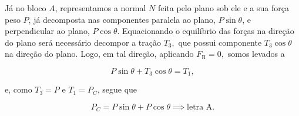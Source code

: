 \begin{exemplo}
Já no bloco $A$, representamos a normal $N$ feita pelo plano sob ele e a sua força peso $P$, já decomposta nas componentes paralela ao plano, $P \sin \theta$, e perpendicular ao plano, $P \cos \theta.$ Equacionando o equilíbrio das forças na direção do plano será necessário decompor a tração $T_3,$ que possui componente $T_3 \cos \theta$ na direção do plano. Logo, em tal direção, aplicando $F_\text{R} = 0,$ somos levados a

$$ P \sin \theta + T_3 \cos \theta = T_1,$$

\noindent e, como $T_3 = P$ e $T_1 = P_C$, segue que 

$$ \boxed{ P_C = P \sin \theta + P \cos \theta \implies \text{letra A}.}$$

\end{exemplo}

\vspace{0.3cm}





